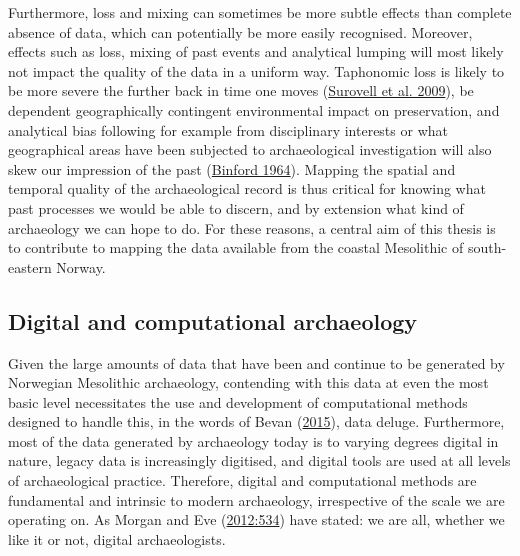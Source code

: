 \documentclass[
  12pt,
  a4paper,
  oneside]{book}
\begin{document}
Furthermore, loss and mixing can sometimes be more subtle effects than complete absence of data, which can potentially be more easily recognised. Moreover, effects such as loss, mixing of past events and analytical lumping will most likely not impact the quality of the data in a uniform way. Taphonomic loss is likely to be more severe the further back in time one moves (\protect\hyperlink{ref-surovell2009a}{Surovell et al. 2009}), be dependent geographically contingent environmental impact on preservation, and analytical bias following for example from disciplinary interests or what geographical areas have been subjected to archaeological investigation will also skew our impression of the past (\protect\hyperlink{ref-binford1964}{Binford 1964}). Mapping the spatial and temporal quality of the archaeological record is thus critical for knowing what past processes we would be able to discern, and by extension what kind of archaeology we can hope to do. For these reasons, a central aim of this thesis is to contribute to mapping the data available from the coastal Mesolithic of south-eastern Norway.

\hypertarget{digital-and-computational-archaeology}{%
\subsection{Digital and computational archaeology}\label{digital-and-computational-archaeology}}

Given the large amounts of data that have been and continue to be generated by Norwegian Mesolithic archaeology, contending with this data at even the most basic level necessitates the use and development of computational methods designed to handle this, in the words of Bevan (\protect\hyperlink{ref-bevan2015}{2015}), \textquotesingle data deluge\textquotesingle. Furthermore, most of the data generated by archaeology today is to varying degrees digital in nature, legacy data is increasingly digitised, and digital tools are used at all levels of archaeological practice. Therefore, digital and computational methods are fundamental and intrinsic to modern archaeology, irrespective of the scale we are operating on. As Morgan and Eve (\protect\hyperlink{ref-morgan2012}{2012:534}) have stated: \textquotesingle we are all, whether we like it or not, digital archaeologists\textquotesingle.
\end{document}
